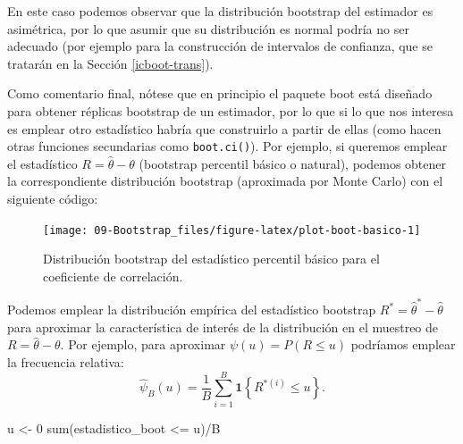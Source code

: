 \documentclass[
]{book}
\newenvironment{Shaded}{\begin{snugshade}}{\end{snugshade}}
\newcommand{\DecValTok}[1]{\textcolor[rgb]{0.00,0.00,0.81}{#1}}
\newcommand{\FunctionTok}[1]{\textcolor[rgb]{0.00,0.00,0.00}{#1}}
\newcommand{\NormalTok}[1]{#1}
\newcommand{\OtherTok}[1]{\textcolor[rgb]{0.56,0.35,0.01}{#1}}
\newcommand{\SpecialCharTok}[1]{\textcolor[rgb]{0.00,0.00,0.00}{#1}}
\theoremstyle{break}
\theoremstyle{nonumberplain}
\begin{document}
En este caso podemos observar que la distribución bootstrap del estimador es asimétrica, por lo que asumir que su distribución es normal podría no ser adecuado (por ejemplo para la construcción de intervalos de confianza, que se tratarán en la Sección \ref{icboot-trans}).

Como comentario final, nótese que en principio el paquete boot está diseñado para obtener réplicas bootstrap de un estimador, por lo que si lo que nos interesa es emplear otro estadístico habría que construirlo a partir de ellas (como hacen otras funciones secundarias como \texttt{boot.ci()}).
Por ejemplo, si queremos emplear el estadístico \(R = \hat \theta - \theta\)
(bootstrap percentil básico o natural), podemos obtener la correspondiente distribución bootstrap (aproximada por Monte Carlo) con el siguiente código:

\begin{Shaded}
\end{Shaded}

\begin{figure}[!htb]

{\centering \texttt{[image: 09-Bootstrap\_files/figure-latex/plot-boot-basico-1]} 

}

\caption{Distribución bootstrap del estadístico percentil básico para el coeficiente de correlación.}\label{fig:plot-boot-basico}
\end{figure}

Podemos emplear la distribución empírica del estadístico bootstrap \(R^{\ast} = \hat \theta^{\ast} - \hat \theta\) para aproximar la característica de interés de la distribución en el muestreo de \(R = \hat \theta - \theta\).
Por ejemplo, para aproximar \(\psi(u) = P\left( R \leq u \right)\) podríamos emplear la frecuencia relativa:
\[\hat{\psi}_{B}(u) =
\frac{1}{B}\sum_{i=1}^{B}\mathbf{1}\left\{ R^{\ast (i)}\leq u\right\}.\]

\begin{Shaded}
\begin{Highlighting}[]
\NormalTok{u }\OtherTok{\textless{}{-}} \DecValTok{0}
\FunctionTok{sum}\NormalTok{(estadistico\_boot }\SpecialCharTok{\textless{}=}\NormalTok{ u)}\SpecialCharTok{/}\NormalTok{B}
\end{Highlighting}
\end{Shaded}
\end{document}
